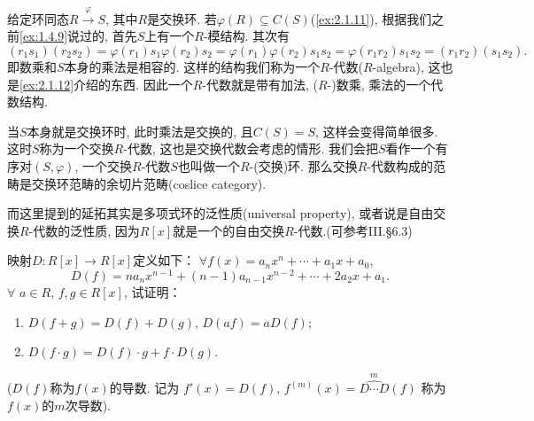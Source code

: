 \begin{remark}
    给定环同态$R \overset{\varphi}\to S$, 其中$R$是交换环. 若$\varphi(R) \subseteq C(S)$(\ref{ex:2.1.11}), 根据我们之前\ref{ex:1.4.9}说过的, 首先$S$上有一个$R$-模结构. 其次有
\[
    (r_1s_1)(r_2s_2) = \varphi(r_1)s_1\varphi(r_2)s_2 = \varphi(r_1)\varphi(r_2)s_1s_2 = \varphi(r_1r_2)s_1s_2 = (r_1r_2)(s_1s_2).
\]
即数乘和$S$本身的乘法是相容的. 这样的结构我们称为一个$R$-代数($R$-algebra), 这也是\ref{ex:2.1.12}介绍的东西. 因此一个$R$-代数就是带有加法, ($R$-)数乘, 乘法的一个代数结构.

当$S$本身就是交换环时, 此时乘法是交换的, 且$C(S) = S$, 这样会变得简单很多. 这时$S$称为一个交换$R$-代数, 这也是交换代数会考虑的情形. 我们会把$S$看作一个有序对$(S, \varphi)$, 一个交换$R$-代数$S$也叫做一个$R$-(交换)环. 那么交换$R$-代数构成的范畴是交换环范畴的余切片范畴(coslice category).

而这里提到的延拓其实是多项式环的泛性质(universal property), 或者说是自由交换$R$-代数的泛性质, 因为$R[x]$就是一个的自由交换$R$-代数.(可参考\cite{aluffi2009algebra}III.\S6.3)
\end{remark}

\begin{problem}\label{ex:2.1.9}
    映射$D:R[x] \longrightarrow R[x]$定义如下：
$\forall f(x) = a_nx^n + \cdots + a_1x + a_0$,
\[
    D(f) = na_nx^{n - 1} + (n - 1)a_{n - 1}x^{n - 2} + \cdots + 2a_2x + a_1.
\]
$\forall$ $a \in R$, $f, g \in R[x]$, 试证明：
\begin{enumerate}[(1)]
    \item $D(f + g) = D(f) + D(g)$, $D(af) = aD(f)$;
    \item $D(f \cdot g) = D(f) \cdot g + f \cdot D(g)$.
\end{enumerate}
($D(f)$称为$f(x)$的导数. 记为
$f'(x) = D(f),\, f^{(m)}(x) = \overset{m}{\widehat{D \cdots D}}(f)$
称为$f(x)$的$m$次导数).
\end{problem}

